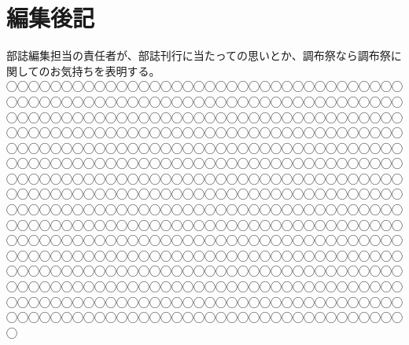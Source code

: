 \documentclass[../main]{subfiles}
\begin{document}
\chapter{編集後記}
\vspace{2\zw}
部誌編集担当の責任者が、部誌刊行に当たっての思いとか、調布祭なら調布祭に関してのお気持ちを表明する。◯◯◯◯◯◯◯◯◯◯◯◯◯◯◯◯◯◯◯◯◯◯◯◯◯◯◯◯◯◯◯◯◯◯◯◯◯◯◯◯◯◯◯◯◯◯◯◯◯◯◯◯◯◯◯◯◯◯◯◯◯◯◯◯◯◯◯◯◯◯◯◯◯◯◯◯◯◯◯◯◯◯◯◯◯◯◯◯◯◯◯◯◯◯◯◯◯◯◯◯◯◯◯◯◯◯◯◯◯◯◯◯◯◯◯◯◯◯◯◯◯◯◯◯◯◯◯◯◯◯◯◯◯◯◯◯◯◯◯◯◯◯◯◯◯◯◯◯◯◯◯◯◯◯◯◯◯◯◯◯◯◯◯◯◯◯◯◯◯◯◯◯◯◯◯◯◯◯◯◯◯◯◯◯◯◯◯◯◯◯◯◯◯◯◯◯◯◯◯◯◯◯◯◯◯◯◯◯◯◯◯◯◯◯◯◯◯◯◯◯◯◯◯◯◯◯◯◯◯◯◯◯◯◯◯◯◯◯◯◯◯◯◯◯◯◯◯◯◯◯◯◯◯◯◯◯◯◯◯◯◯◯◯◯◯◯◯◯◯◯◯◯◯◯◯◯◯◯◯◯◯◯◯◯◯◯◯◯◯◯◯◯◯◯◯◯◯◯◯◯◯◯◯◯◯◯◯◯◯◯◯◯◯◯◯◯◯◯◯◯◯◯◯◯◯◯◯◯◯◯◯◯◯◯◯◯◯◯◯◯◯◯◯◯◯◯◯◯◯◯◯◯◯◯◯◯◯◯◯◯◯◯◯◯◯◯◯◯◯◯◯◯◯◯◯◯◯◯◯◯◯◯◯◯◯◯◯◯◯◯◯◯◯◯◯◯◯◯◯◯◯◯◯◯◯◯◯◯◯◯◯◯◯◯◯◯◯◯◯◯◯◯◯◯◯◯◯◯◯◯◯◯◯◯◯◯◯◯◯◯◯◯◯◯◯◯◯◯◯◯◯◯◯◯◯◯◯◯◯◯◯◯◯◯◯◯◯◯◯◯◯◯◯◯◯◯◯◯◯◯◯◯◯◯◯◯◯◯◯◯◯◯◯◯◯◯◯◯◯◯◯◯◯◯◯◯◯◯◯◯◯◯◯◯◯◯◯◯◯◯◯◯◯◯◯◯◯◯◯◯◯◯◯◯◯◯◯◯◯◯◯◯◯◯◯◯◯◯◯◯◯◯◯◯◯◯◯◯◯◯◯◯◯◯◯◯◯◯◯◯◯◯◯◯◯◯◯

\vspace{2\zw}
\end{document}
